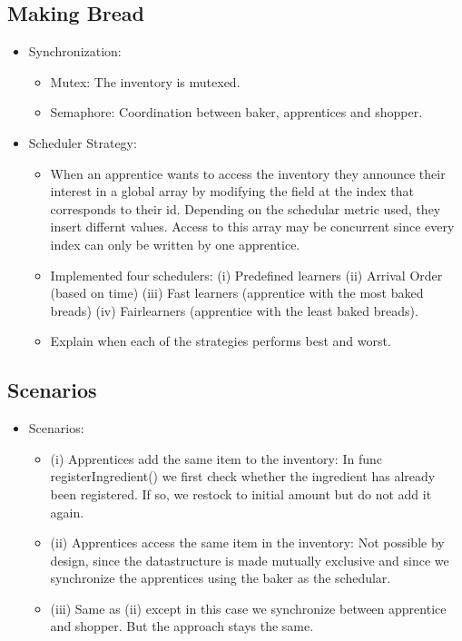 \documentclass[11pt]{article}
\begin{document}
\subsection{Making Bread}
\label{sec:orgd65960b}

\begin{itemize}
\item Synchronization:\\
\begin{itemize}
\item Mutex: The inventory is mutexed.\\
\item Semaphore: Coordination between baker, apprentices and shopper.\\
\end{itemize}
\item Scheduler Strategy:\\
\begin{itemize}
\item When an apprentice wants to access the inventory they announce their interest in a global array by modifying the field at the index that corresponds to their id. Depending on the schedular metric used, they insert differnt values. Access to this array may be concurrent since every index can only be written by one apprentice.\\
\item Implemented four schedulers: (i) Predefined learners (ii) Arrival Order (based on time) (iii) Fast learners (apprentice with the most baked breads) (iv) Fairlearners (apprentice with the least baked breads).\\
\item Explain when each of the strategies performs best and worst.\\
\end{itemize}
\end{itemize}

\subsection{Scenarios}
\label{sec:orgff74c0c}
\begin{itemize}
\item Scenarios:\\
\begin{itemize}
\item (i) Apprentices add the same item to the inventory: In func registerIngredient() we first check whether the ingredient has already been registered. If so, we restock to initial amount but do not add it again.\\
\item (ii) Apprentices access the same item in the inventory: Not possible by design, since the datastructure is made mutually exclusive and since we synchronize the apprentices using the baker as the schedular.\\
\item (iii) Same as (ii) except in this case we synchronize between apprentice and shopper. But the approach stays the same.\\
\end{itemize}
\end{itemize}
\end{document}
